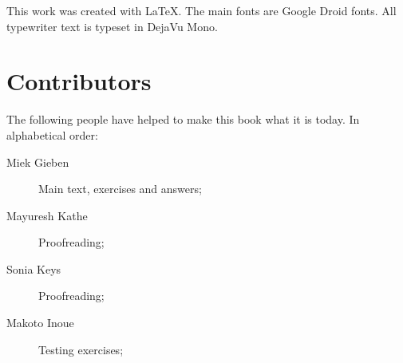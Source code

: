 This work was created with \LaTeX. The main fonts are Google Droid
fonts.
All typewriter text is typeset in DejaVu Mono.

\section{Contributors}
The following people have helped to make this book what it is today.
In alphabetical order:
\begin{description}
\item[Miek Gieben] 
{Main text, exercises and answers;}
\item[Mayuresh Kathe]
{Proofreading;}
\item[Sonia Keys]
{Proofreading;}
\item[Makoto Inoue]
{Testing exercises;}
\end{description}
